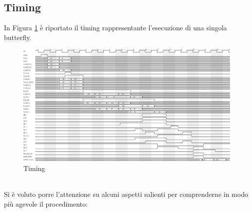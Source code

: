 \documentclass[a4paper, titlepage]{article}
\begin{document}
\subsection{Timing} %
In Figura \ref{fig:timing_butterfly} è riportato il timing rappresentante l'esecuzione di una singola butterfly.\\
\begin{figure}
    \centering
    \includegraphics[scale=0.43]{timing_butterfly.png}
    \caption{Timing}
    \label{fig:timing_butterfly}
\end{figure}\\
\newpage
Si è voluto porre l'attenzione su alcuni aspetti salienti per comprenderne in modo più agevole il procedimento:
\end{document}
